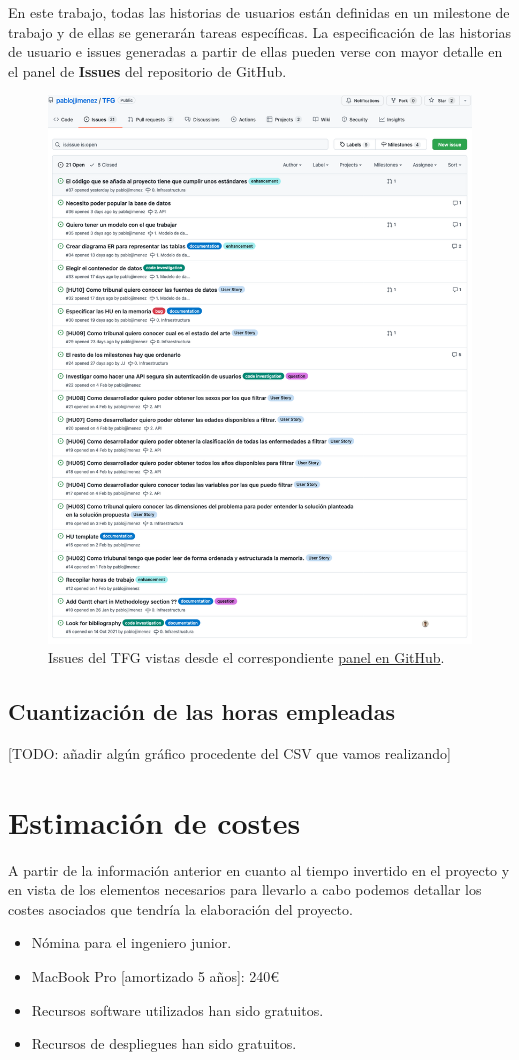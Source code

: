 En este trabajo, todas las historias de usuarios están definidas en un milestone
de trabajo y de ellas se generarán tareas específicas. La especificación de las historias de usuario e issues generadas a partir de ellas
pueden verse con mayor detalle en el panel de \textbf{Issues} del repositorio de GitHub.
\begin{figure}[]
	\centering
	\includegraphics[scale=0.3]{doc/logos/imgs/issues.png}
	\caption{ Issues del TFG vistas desde el correspondiente \href{https://github.com/pablojjimenez/TFG/issues}{panel en GitHub}. }
    \label{fig:worst_f_value}
\end{figure}

\subsection{Cuantización de las horas empleadas}
[TODO: añadir algún gráfico procedente del CSV que vamos realizando]

\section{Estimación de costes}
A partir de la información anterior en cuanto al tiempo invertido en el proyecto y en vista de los elementos necesarios
para llevarlo a cabo podemos detallar los costes asociados que tendría la elaboración del proyecto.

\begin{itemize}
    \item Nómina para el ingeniero junior.
    \item MacBook Pro [amortizado 5 años]: 240€
    \item Recursos software utilizados han sido gratuitos.
    \item Recursos de despliegues han sido gratuitos.
\end{itemize}
